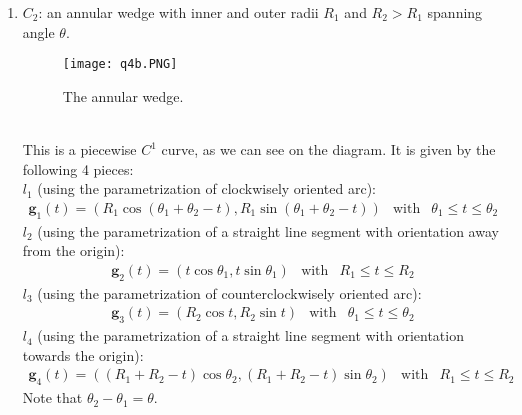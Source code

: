 \documentclass{article}
\begin{document}
\begin{enumerate}
\begin{enumerate}
  circulation is independent of the radius of the circle because the field strength is inversely proportional to the distance from the origin.\\
  \\
  Notice that in case 1, if we take \(R=r_0\), we will get
  \begin{equation}
    \int_{C_1} \mathbf{u}\cdot \dd \mathbf{x} = 2\pi \Omega r_0^2 = 2\pi b
  \end{equation}
  (using equation (6))
  which is equal to that of case 2. So, when the radius \(R\) is greater than \(r_0\), the circulation will remain the same as
  that of \(r_0\).
  \\
  \item \(C_2\): an annular wedge with inner and outer radii \(R_1\) and \(R_2>R_1\) spanning angle \(\theta\).
  \begin{figure}[ht]
      \centering
      \texttt{[image: q4b.PNG]}
      \caption{The annular wedge.}
      \label{fig:label}
  \end{figure}\\
  This is a piecewise \(C^1\) curve, as we can see on the diagram. It is given by the following 4 pieces:\\
  \(l_1\) (using the parametrization of clockwisely oriented arc):
  \begin{eqnarray}
    \mathbf{g}_1(t) = (R_1 \cos(\theta_1 + \theta_2 -t ) , R_1\sin(\theta_1 + \theta_2 -t )) & \text{with} & \theta_1 \le t\le \theta_2
  \end{eqnarray}
  \(l_2\) (using the parametrization of a straight line segment with orientation away from the origin):
  \begin{eqnarray}
    \mathbf{g}_2(t) = (t \cos \theta_1, t\sin \theta_1) & \text{with} & R_1 \le t \le R_2
  \end{eqnarray}
  \(l_3\) (using the parametrization of counterclockwisely oriented arc):
  \begin{eqnarray}
    \mathbf{g}_3(t) = (R_2 \cos t , R_2\sin t) & \text{with} &  \theta_1 \le t\le \theta_2
  \end{eqnarray}
  \(l_4\) (using the parametrization of a straight line segment with orientation towards the origin):
  \begin{eqnarray}
    \mathbf{g}_4(t) = ((R_1+R_2-t)\cos\theta_2, (R_1+R_2 - t)\sin \theta_2) & \text{with} & R_1 \le t \le R_2
  \end{eqnarray}
  Note that \(\theta_2-\theta_1 = \theta\). \\
  \\

\end{enumerate}
\end{enumerate}
\end{document}
